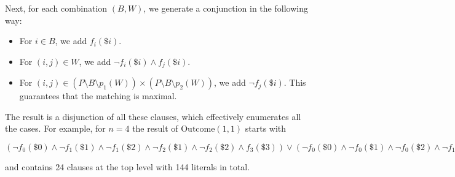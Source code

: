 \begin{example}[Mastermind]
Next, for each combination $(B, W)$, we generate a conjunction
  in the following way:
\begin{itemize}
\item For $i\in B$, we add $f_i(\$i)$.
\item For $(i,j)\in W$, we add $\neg f_i(\$i) \wedge f_j(\$i)$.
\item For $(i,j)\in (P\setminus B\setminus p_1(W))
             \times (P\setminus B\setminus p_2(W))$, we add $\neg f_j(\$i)$.
  This guarantees that the matching is maximal.
\end{itemize}

The result is a disjunction of all these clauses, which effectively enumerates all the cases.
For example, for $n = 4$ the result of $\textrm{Outcome}(1, 1)$ starts with

\smallskip
\begin{scriptsize}$(
\neg f_0(\$0) \wedge \neg f_1(\$1) \wedge \neg f_1(\$2) \wedge
  \neg f_2(\$1) \wedge \neg f_2(\$2) \wedge f_3(\$3)) \vee
(\neg f_0(\$0) \wedge \neg f_0(\$1) \wedge \neg f_0(\$2) \wedge
  \neg f_1(\$0) \wedge \neg f_1(\$1) \wedge \neg f_2(\$1) \wedge
  \neg f_2(\$2) \wedge f_3(\$3)) \vee
(\neg f_0(\$0) \wedge \neg f_0(\$1) \wedge \neg f_0(\$2) \wedge
   \neg f_1(\$1) \wedge \neg f_1(\$2) \wedge \neg f_2(\$0) \wedge
   \neg f_2(\$2) \wedge f_3(\$3)) \vee
(\neg f_0(\$0) \wedge \neg f_0(\$2) \wedge \neg f_1(\$0) \wedge
  \neg f_1(\$1) \wedge \neg f_2(\$0) \wedge \neg f_2(\$1) \wedge
  \neg f_2(\$2) \wedge f_3(\$3)) \vee
(\neg f_0(\$0) \wedge \neg f_0(\$1) \wedge \neg f_1(\$1) \wedge
  \neg f_1(\$2) \wedge \neg f_2(\$0) \wedge \neg f_2(\$1) \wedge
  \neg f_2(\$2) \wedge f_3(\$3)) \vee
(\neg f_0(\$0) \wedge \neg f_0(\$1) \wedge \neg f_1(\$0) \wedge
  \neg f_1(\$1) \wedge \neg f_2(\$2) \wedge f_3(\$3)) \vee
(\neg f_0(\$0) \wedge \neg f_0(\$1) \wedge \neg f_1(\$0) \wedge
  \neg f_1(\$1) \wedge \neg f_1(\$2) \wedge \neg f_2(\$0) \wedge
  \neg f_2(\$2) \wedge f_3(\$3)) \vee
(\neg f_0(\$0) \wedge \neg f_0(\$2) \wedge \neg f_1(\$1) \wedge
  \neg f_2(\$0) \wedge \neg f_2(\$2) \wedge f_3(\$3)) \vee
(\neg f_0(\$0) \wedge \neg f_0(\$2) \wedge \neg f_1(\$0) \wedge
  \neg f_1(\$1) \wedge \neg f_1(\$2) \wedge \neg f_2(\$1) \wedge
  \neg f_2(\$2) \wedge f_3(\$3)) \vee ...,$
\end{scriptsize}

and contains 24 clauses at the top level with 144 literals in total.
\end{example}


